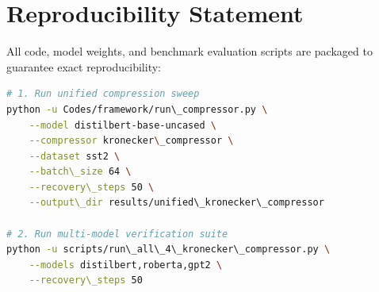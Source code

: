 \section{Reproducibility Statement}
All code, model weights, and benchmark evaluation scripts are packaged to guarantee exact reproducibility:
\begin{lstlisting}[language=bash]
# 1. Run unified compression sweep
python -u Codes/framework/run\_compressor.py \
    --model distilbert-base-uncased \
    --compressor kronecker\_compressor \
    --dataset sst2 \
    --batch\_size 64 \
    --recovery\_steps 50 \
    --output\_dir results/unified\_kronecker\_compressor

# 2. Run multi-model verification suite
python -u scripts/run\_all\_4\_kronecker\_compressor.py \
    --models distilbert,roberta,gpt2 \
    --recovery\_steps 50
\end{lstlisting}
